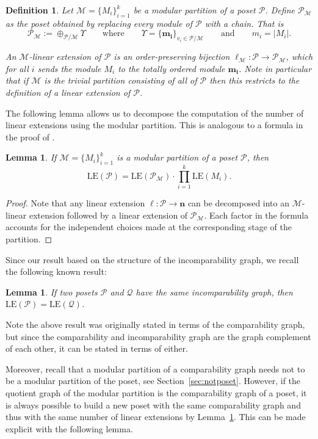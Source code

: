 \documentclass[9pt,a4paper,oneside]{article}
\newtheorem{lemma}[theorem]{Lemma}
\newtheorem{definition}[theorem]{Definition}
\newcommand{\cM}{\mathcal{M}}
\newcommand{\cQ}{\mathcal{Q}}
\newcommand{\cP}{\mathcal{P}}
\newcommand{\bn}{\mathbf{n}}
\newcommand{\lex}{\mathrm{LE}}
\begin{document}
\begin{definition}
Let $\cM=\{ M_i\}_{i=1}^k$ be a modular partition of a poset $\cP$.
Define $\mathcal{P}_\cM$ as the poset obtained by replacing every module of $\cP$ with a chain.  That is 
\[\cP_\cM := \oplus_{\cP/\cM} \Upsilon 
\quad\quad \text{where} \quad\quad 
\Upsilon=\{\mathbf{m_i}\}_{v_i\in \cP/\cM}
\quad\quad \text{and} \quad\quad m_i=|M_i|.\]

An \emph{$\cM$-linear extension of $\cP$} is an order-preserving bijection $\ell_\cM:\cP\to\cP_\cM$, which for all $i$ sends the module $M_i$ to the totally ordered module $\mathbf{m_i}$. 
Note in particular that if $\cM$ is the trivial partition consisting of all of $\cP$ then this restricts to the definition of a linear extension of $\cP$.
\end{definition}

The following lemma allows us to decompose the computation of the number of linear extensions using the modular partition. 
 This is analogous to a formula in the proof of \cite[Proposition 3.4]{Hab87}.
\begin{lemma}\label{lem:JSgen}
If  $\cM=\{ M_i\}_{i=1}^k$ is a modular partition of a poset $\cP$, then
  \[\lex(\cP)=\lex(\cP_\cM)\cdot\prod_{i=1}^{k}\lex(M_i).\]
\end{lemma}

\begin{proof}
Note that any linear extension $\ell:\cP\to\bn$ can be decomposed into an $\cM$-linear extension followed by a linear extension of $\cP_\cM$.  
Each factor in the formula accounts for the independent choices made at the corresponding stage of the partition.
\end{proof}

Since our result based on the structure of the incomparability graph, we recall the following known result:
\begin{lemma}\label{lem:sameIG}\cite{Edel89}
If two posets $\cP$ and $\cQ$ have the same incomparability graph, then $\lex(\cP)=\lex(\cQ)$.
\end{lemma}
Note the above result was originally stated in terms of the comparability graph, but since the comparability and incomparability graph are the graph complement of each other, it can be stated in terms of either.

Moreover, recall that a modular partition of a comparability graph needs not to be a modular partition of the poset, see Section~\ref{sec:notposet}.
However, if the quotient graph of the modular partition is the comparability graph of a poset, it is always possible to build a new poset with the same comparability graph and thus with the same number of linear extensions by Lemma~\ref{lem:sameIG}.  This can be made explicit with the following lemma.
\end{document}
